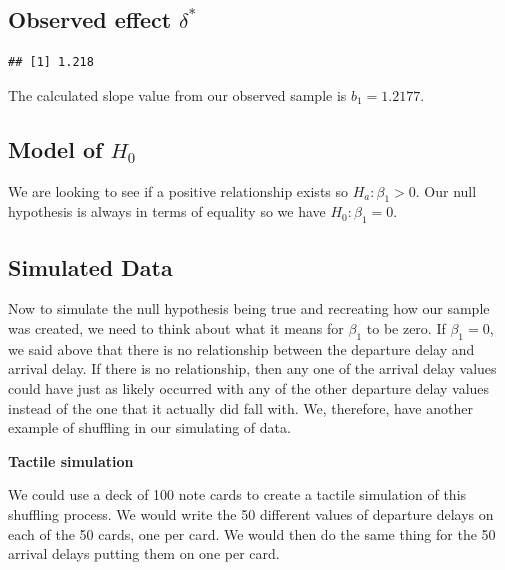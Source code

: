 \documentclass[]{tufte-book}
\newenvironment{Shaded}{\begin{snugshade}}{\end{snugshade}}
\newcommand{\KeywordTok}[1]{\textcolor[rgb]{0.13,0.29,0.53}{\textbf{{#1}}}}
\newcommand{\DecValTok}[1]{\textcolor[rgb]{0.00,0.00,0.81}{{#1}}}
\newcommand{\StringTok}[1]{\textcolor[rgb]{0.31,0.60,0.02}{{#1}}}
\newcommand{\NormalTok}[1]{{#1}}
\theoremstyle{definition}
\theoremstyle{definition}
\theoremstyle{remark}
\begin{document}
\subsection{\texorpdfstring{Observed effect
\(\delta^*\)}{Observed effect \textbackslash{}delta\^{}*}}\label{observed-effect-delta-2}

\begin{Shaded}
\end{Shaded}

\begin{verbatim}
## [1] 1.218
\end{verbatim}

The calculated slope value from our observed sample is \(b_1 = 1.2177\).

\subsection{\texorpdfstring{Model of
\(H_0\)}{Model of H\_0}}\label{model-of-h_0-2}

We are looking to see if a positive relationship exists so
\(H_a: \beta_1 > 0\). Our null hypothesis is always in terms of equality
so we have \(H_0: \beta_1 = 0\).

\subsection{Simulated Data}\label{simulated-data-2}

Now to simulate the null hypothesis being true and recreating how our
sample was created, we need to think about what it means for \(\beta_1\)
to be zero. If \(\beta_1 = 0\), we said above that there is no
relationship between the departure delay and arrival delay. If there is
no relationship, then any one of the arrival delay values could have
just as likely occurred with any of the other departure delay values
instead of the one that it actually did fall with. We, therefore, have
another example of shuffling in our simulating of data.

\textbf{Tactile simulation}

We could use a deck of 100 note cards to create a tactile simulation of
this shuffling process. We would write the 50 different values of
departure delays on each of the 50 cards, one per card. We would then do
the same thing for the 50 arrival delays putting them on one per card.
\end{document}
